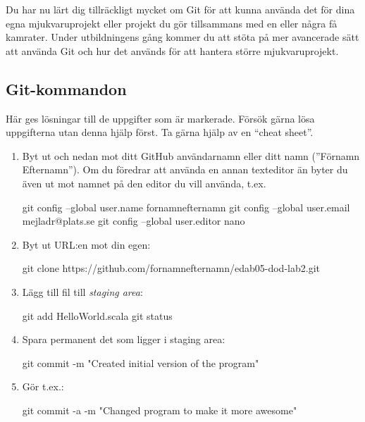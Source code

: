 Du har nu lärt dig tillräckligt mycket om Git för att kunna använda det för dina egna mjukvaruprojekt eller projekt du gör tillsammans med en eller några få kamrater. Under utbildningens gång kommer du att stöta på mer avancerade sätt att använda Git och hur det används för att hantera större mjukvaruprojekt.




\newpage

\subsection*{Git-kommandon}
Här ges lösningar till de uppgifter som är markerade. Försök gärna lösa uppgifterna utan denna hjälp först. Ta gärna hjälp av en ``cheat sheet''.

\begin{enumerate}[label=C\arabic*]
	\item\label{git-config} Byt ut  och  nedan mot ditt GitHub användarnamn eller ditt namn (''Förnamn Efternamn''). Om du föredrar att använda en annan texteditor än  byter du även ut  mot namnet på den editor du vill använda, t.ex. 
	      \begin{Code}
		      git config --global user.name fornamnefternamn
		      git config --global user.email mejladr@plats.se
		      git config --global user.editor nano
	      \end{Code}

	\item\label{git-clone} Byt ut URL:en mot din egen:
	      \begin{Code}
		      git clone https://github.com/fornamnefternamn/edab05-dod-lab2.git
	      \end{Code}

	\item\label{git-add} Lägg till fil till \emph{staging area}:
	      \begin{Code}
		      git add HelloWorld.scala
		      git status
	      \end{Code}

	\item\label{git-commit} Spara permanent det som ligger i staging area:
	      \begin{Code}
		      git commit -m "Created initial version of the program"
	      \end{Code}

	\item\label{git-commit-a} Gör t.ex.:
	      \begin{Code}
		      git commit -a -m "Changed program to make it more awesome"
	      \end{Code}


\end{enumerate}
